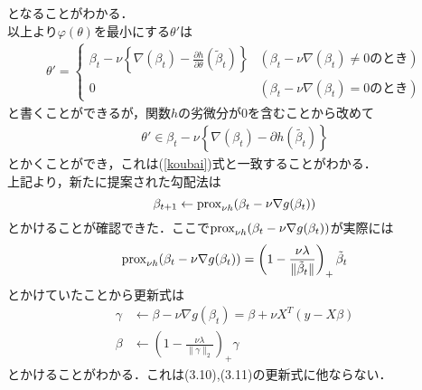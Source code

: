 \documentclass{jsarticle}
\theoremstyle{definition}
\theoremstyle{mystyle} %
\begin{document}
となることがわかる．\\
以上より$\varphi(\theta)$を最小にする$\theta'$は
\begin{align*}
\theta'=\begin{cases}
\beta_t-\nu\left\{\nabla (\beta_t)- \displaystyle\frac{\partial h}{\partial \theta}(\tilde \beta_t)\right\}&(\beta_t-\nu\nabla (\beta_t)\neq0のとき)\\
0 &(\beta_t-\nu\nabla (\beta_t)=0のとき)
\end{cases}
\end{align*}
と書くことができるが，関数$h$の劣微分が$0$を含むことから改めて
\begin{align*}
\theta' \in \beta_t-\nu\left\{\nabla (\beta_t)- \displaystyle\partial h(\tilde{\beta_t})\right\}
\end{align*}
とかくことができ，これは(\ref{koubai})式と一致することがわかる．\\


上記より，新たに提案された勾配法は
$$\beta_{t+1}\leftarrow {\rm prox}_{\nu h}(\beta_t-\nu\nabla g(\beta_t))$$
とかけることが確認できた．ここで$ {\rm prox}_{\nu h}(\beta_t-\nu\nabla g(\beta_t))$が実際には
$${\rm prox}_{\nu h}(\beta_t-\nu\nabla g(\beta_t))  = \left(1-\frac{\nu\lambda}{\|\tilde\beta_t\|}\right)_+\tilde\beta_t$$とかけていたことから更新式は
\begin{align*}
\gamma &\leftarrow \beta-\nu\nabla g(\beta_t)=\beta +\nu X^T(y-X\beta)\\
\beta&\leftarrow \left(1-\frac{\nu\lambda}{\|\gamma\|_2}\right)_+\gamma
\end{align*}
とかけることがわかる．これは(3.10),(3.11)の更新式に他ならない．\\
\end{document}
